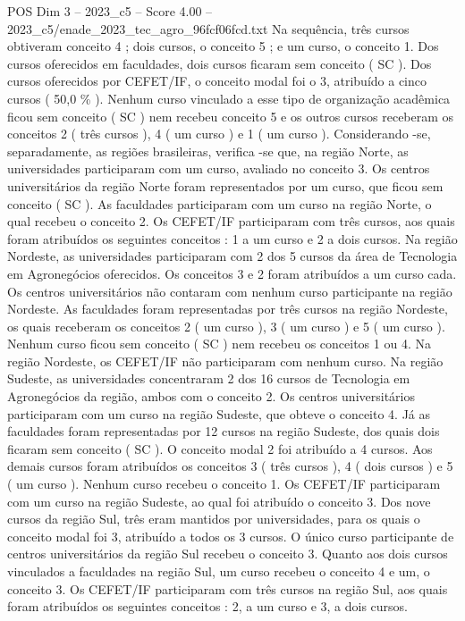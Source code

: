 \begin{textsample}{POS Dim 3 – 2023\_c5 – Score 4.00 – 2023\_c5/enade\_2023\_tec\_agro\_96fcf06fcd.txt}
Na sequência, três cursos obtiveram conceito 4 ; dois cursos, o conceito 5 ; e um curso, o conceito 1.
Dos cursos oferecidos em faculdades, dois cursos ficaram sem conceito ( SC ).
Dos cursos oferecidos por CEFET/IF, o conceito modal foi o 3, atribuído a cinco cursos ( 50,0 \% ).
Nenhum curso vinculado a esse tipo de organização acadêmica ficou sem conceito ( SC ) nem recebeu conceito 5 e os outros cursos receberam os conceitos 2 ( três cursos ), 4 ( um curso ) e 1 ( um curso ).
Considerando -se, separadamente, as regiões brasileiras, verifica -se que, na região Norte, as universidades participaram com um curso, avaliado no conceito 3.
Os centros universitários da região Norte foram representados por um curso, que ficou sem conceito ( SC ).
As faculdades participaram com um curso na região Norte, o qual recebeu o conceito 2.
Os CEFET/IF participaram com três cursos, aos quais foram atribuídos os seguintes conceitos : 1 a um curso e 2 a dois cursos.
Na região Nordeste, as universidades participaram com 2 dos 5 cursos da área de Tecnologia em Agronegócios oferecidos.
Os conceitos 3 e 2 foram atribuídos a um curso cada.
Os centros universitários não contaram com nenhum curso participante na região Nordeste.
As faculdades foram representadas por três cursos na região Nordeste, os quais receberam os conceitos 2 ( um curso ), 3 ( um curso ) e 5 ( um curso ).
Nenhum curso ficou sem conceito ( SC ) nem recebeu os conceitos 1 ou 4.
Na região Nordeste, os CEFET/IF não participaram com nenhum curso.
Na região Sudeste, as universidades concentraram 2 dos 16 cursos de Tecnologia em Agronegócios da região, ambos com o conceito 2.
Os centros universitários participaram com um curso na região Sudeste, que obteve o conceito 4.
Já as faculdades foram representadas por 12 cursos na região Sudeste, dos quais dois ficaram sem conceito ( SC ).
O conceito modal 2 foi atribuído a 4 cursos.
Aos demais cursos foram atribuídos os conceitos 3 ( três cursos ), 4 ( dois cursos ) e 5 ( um curso ).
Nenhum curso recebeu o conceito 1.
Os CEFET/IF participaram com um curso na região Sudeste, ao qual foi atribuído o conceito 3.
Dos nove cursos da região Sul, três eram mantidos por universidades, para os quais o conceito modal foi 3, atribuído a todos os 3 cursos.
O único curso participante de centros universitários da região Sul recebeu o conceito 3.
Quanto aos dois cursos vinculados a faculdades na região Sul, um curso recebeu o conceito 4 e um, o conceito 3.
Os CEFET/IF participaram com três cursos na região Sul, aos quais foram atribuídos os seguintes conceitos : 2, a um curso e 3, a dois cursos.

\end{textsample}
